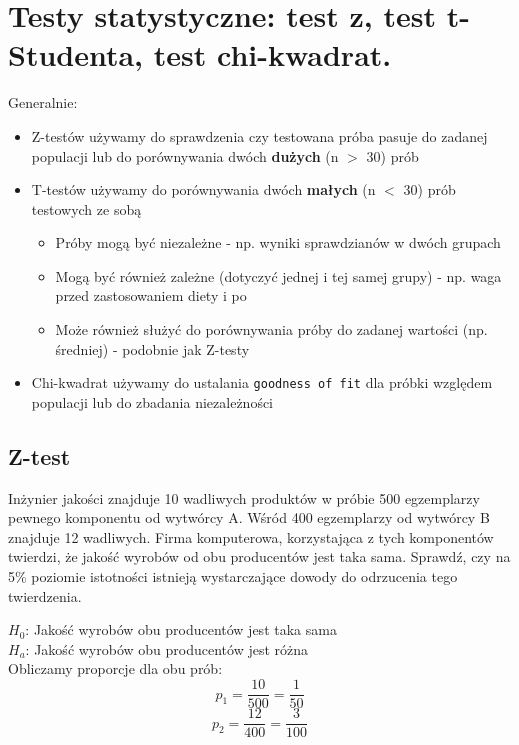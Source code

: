 \documentclass[12pt]{article}
\begin{document}
    \section{Testy statystyczne: test z, test t-Studenta, test chi-kwadrat.}
    Generalnie:
    \begin{itemize}
        \item Z-testów używamy do sprawdzenia czy testowana próba pasuje do zadanej populacji lub do porównywania dwóch \textbf{dużych} (n $>$ 30) prób
        \item T-testów używamy do porównywania dwóch \textbf{małych} (n $<$ 30) prób testowych ze sobą
        \begin{itemize}
            \item Próby mogą być niezależne - np. wyniki sprawdzianów w dwóch grupach
            \item Mogą być również zależne (dotyczyć jednej i tej samej grupy) - np. waga przed zastosowaniem diety i po
            \item Może również służyć do porównywania próby do zadanej wartości (np. średniej) - podobnie jak Z-testy
        \end{itemize}
        \item Chi-kwadrat używamy do ustalania \texttt{goodness of fit} dla próbki względem populacji lub do zbadania niezależności
    \end{itemize}

    \subsection{Z-test}
    \begin{exercise}
        Inżynier jakości znajduje 10 wadliwych produktów w próbie 500 egzemplarzy pewnego komponentu od wytwórcy A. Wśród 400 egzemplarzy od wytwórcy B znajduje 12 wadliwych. Firma komputerowa, korzystająca z tych komponentów twierdzi, że jakość wyrobów od obu producentów jest taka sama. Sprawdź, czy na 5\% poziomie istotności istnieją wystarczające dowody do odrzucenia tego twierdzenia.
    \end{exercise}

    $H_{0}$: Jakość wyrobów obu producentów jest taka sama \\

    $H_{a}$: Jakość wyrobów obu producentów jest różna \\

    Obliczamy proporcje dla obu prób:
    \begin{equation*}
        p_{1} = \frac{10}{500} = \frac{1}{50}
    \end{equation*}
    \begin{equation*}
        p_{2} = \frac{12}{400} = \frac{3}{100}
    \end{equation*}
\end{document}
